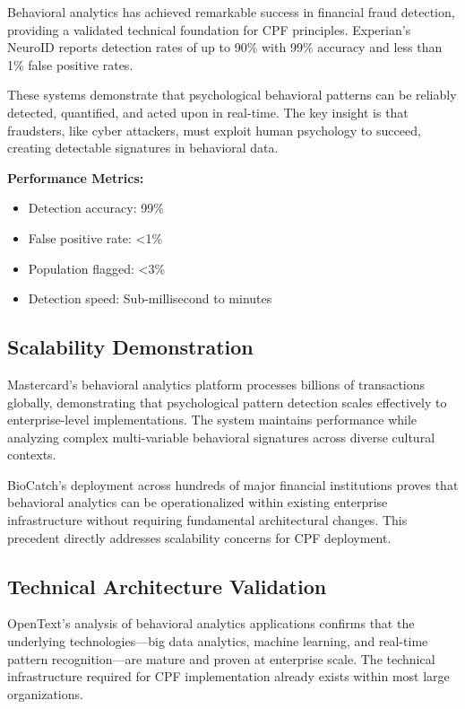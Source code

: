 \documentclass[11pt,a4paper]{article}
\begin{document}
Behavioral analytics has achieved remarkable success in financial fraud detection, providing a validated technical foundation for CPF principles. Experian's NeuroID reports detection rates of up to 90\% with 99\% accuracy and less than 1\% false positive rates\cite{experian2024}.

These systems demonstrate that psychological behavioral patterns can be reliably detected, quantified, and acted upon in real-time. The key insight is that fraudsters, like cyber attackers, must exploit human psychology to succeed, creating detectable signatures in behavioral data.

\textbf{Performance Metrics:}
\begin{itemize}
\item Detection accuracy: 99\%
\item False positive rate: <1\%
\item Population flagged: <3\%
\item Detection speed: Sub-millisecond to minutes
\end{itemize}

\subsection{Scalability Demonstration}

Mastercard's behavioral analytics platform processes billions of transactions globally, demonstrating that psychological pattern detection scales effectively to enterprise-level implementations\cite{mastercard2024}. The system maintains performance while analyzing complex multi-variable behavioral signatures across diverse cultural contexts.

BioCatch's deployment across hundreds of major financial institutions proves that behavioral analytics can be operationalized within existing enterprise infrastructure without requiring fundamental architectural changes\cite{biocatch2024}. This precedent directly addresses scalability concerns for CPF deployment.

\subsection{Technical Architecture Validation}

OpenText's analysis of behavioral analytics applications confirms that the underlying technologies—big data analytics, machine learning, and real-time pattern recognition—are mature and proven at enterprise scale\cite{opentext2024}. The technical infrastructure required for CPF implementation already exists within most large organizations.
\end{document}
